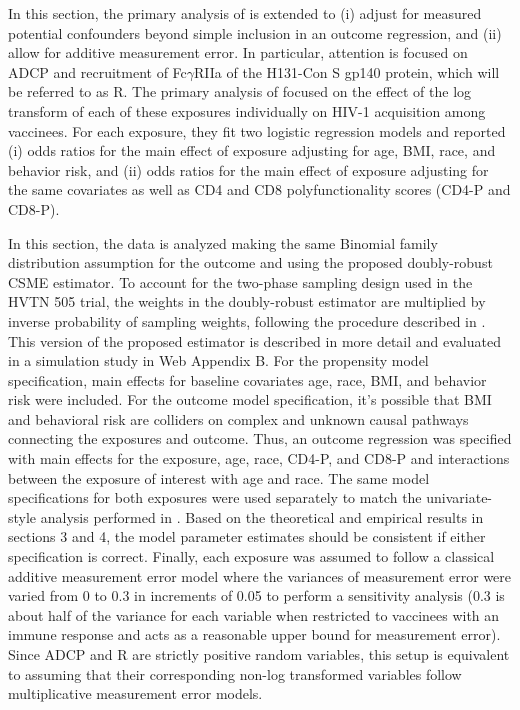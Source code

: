 \documentclass[useAMS,usenatbib,referee]{biom}
\newcommand{\RNum}[1]{\uppercase\expandafter{\romannumeral #1\relax}}
\begin{document}
In this section, the primary analysis of \citet{neidich2019} is extended to (i) adjust for measured potential confounders beyond simple inclusion in an outcome regression, and (ii) allow for additive measurement error. In particular, attention is focused on ADCP and recruitment of Fc$\gamma$RIIa of the H131-Con S gp140 protein, which will be referred to as R\RNum{2}. The primary analysis of \citet{neidich2019} focused on the effect of the log transform of each of these exposures individually on HIV-1 acquisition among vaccinees. For each exposure, they fit two logistic regression models and reported (i) odds ratios for the main effect of exposure adjusting for age, BMI, race, and behavior risk, and (ii) odds ratios for the main effect of exposure adjusting for the same covariates as well as CD4 and CD8 polyfunctionality scores (CD4-P and CD8-P).

In this section, the data is analyzed making the same Binomial family distribution assumption for the outcome and using the proposed doubly-robust CSME estimator. To account for the two-phase sampling design used in the HVTN 505 trial, the weights in the doubly-robust estimator are multiplied by inverse probability of sampling weights, following the procedure described in \citet{wang2009}. This version of the proposed estimator is described in more detail and evaluated in a simulation study in Web Appendix B. For the propensity model specification, main effects for baseline covariates age, race, BMI, and behavior risk were included. For the outcome model specification, it's possible that BMI and behavioral risk are colliders on complex and unknown causal pathways connecting the exposures and outcome. Thus, an outcome regression was specified with main effects for the exposure, age, race, CD4-P, and CD8-P and interactions between the exposure of interest with age and race. The same model specifications for both exposures were used separately to match the univariate-style analysis performed in \citet{neidich2019}. Based on the theoretical and empirical results in sections 3 and 4, the model parameter estimates should be consistent if either specification is correct. Finally, each exposure was assumed to follow a classical additive measurement error model where the variances of measurement error were varied from 0 to 0.3 in increments of 0.05 to perform a sensitivity analysis (0.3 is about half of the variance for each variable when restricted to vaccinees with an immune response and acts as a reasonable upper bound for measurement error). Since ADCP and R\RNum{2} are strictly positive random variables, this setup is equivalent to assuming that their corresponding non-log transformed variables follow multiplicative measurement error models.
\end{document}
